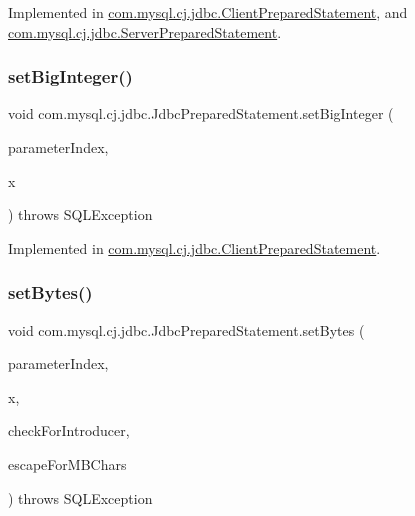 Implemented in \mbox{\hyperlink{classcom_1_1mysql_1_1cj_1_1jdbc_1_1_client_prepared_statement_a352b21fa4a782cfad4065a227985201a}{com.\+mysql.\+cj.\+jdbc.\+Client\+Prepared\+Statement}}, and \mbox{\hyperlink{classcom_1_1mysql_1_1cj_1_1jdbc_1_1_server_prepared_statement_a1bc3e61ca02b73fbbdcc74c8528b41eb}{com.\+mysql.\+cj.\+jdbc.\+Server\+Prepared\+Statement}}.

\mbox{\label{interfacecom_1_1mysql_1_1cj_1_1jdbc_1_1_jdbc_prepared_statement_a6af501f3841da06821f86578cc154116}} 
\subsubsection{\texorpdfstring{set\+Big\+Integer()}{setBigInteger()}}
{\footnotesize\ttfamily void com.\+mysql.\+cj.\+jdbc.\+Jdbc\+Prepared\+Statement.\+set\+Big\+Integer (\begin{DoxyParamCaption}\item[{int}]{parameter\+Index,  }\item[{Big\+Integer}]{x }\end{DoxyParamCaption}) throws S\+Q\+L\+Exception}



Implemented in \mbox{\hyperlink{classcom_1_1mysql_1_1cj_1_1jdbc_1_1_client_prepared_statement_adc2b778f8c9e927d0e10dacab44d0230}{com.\+mysql.\+cj.\+jdbc.\+Client\+Prepared\+Statement}}.

\mbox{\label{interfacecom_1_1mysql_1_1cj_1_1jdbc_1_1_jdbc_prepared_statement_ab355e6fcc10a4fae67e0425b76bc218f}} 
\subsubsection{\texorpdfstring{set\+Bytes()}{setBytes()}}
{\footnotesize\ttfamily void com.\+mysql.\+cj.\+jdbc.\+Jdbc\+Prepared\+Statement.\+set\+Bytes (\begin{DoxyParamCaption}\item[{int}]{parameter\+Index,  }\item[{byte \mbox{[}$\,$\mbox{]}}]{x,  }\item[{boolean}]{check\+For\+Introducer,  }\item[{boolean}]{escape\+For\+M\+B\+Chars }\end{DoxyParamCaption}) throws S\+Q\+L\+Exception}



